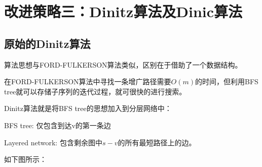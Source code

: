 \section{改进策略三：Dinitz算法及Dinic算法}
\subsection{原始的Dinitz算法}
算法思想与{\sc FORD-FULKERSON}算法类似，区别在于借助了一个数据结构。

在{\sc FORD-FULKERSON}算法中寻找一条增广路径需要$O(m)$的时间，但利用BFS tree就可以存储子序列的迭代过程，就可很快的进行搜索。

Dinitz算法就是将BFS tree的思想加入到分层网络中：
\begin{itemize}
  \begin{small}
  \item BFS tree: 仅包含到达v的第一条边

  \item Layered network: 包含剩余图中$s-v$的所有最短路径上的边。
\end{small}
\end{itemize}
如下图所示：

